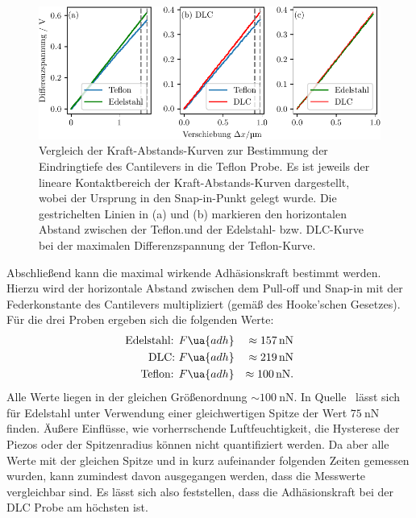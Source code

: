 \begin{figure}
  \centering
  \includegraphics[scale = 1]{../analysis/data/force_distance/eindringtiefe.pdf}
  \caption{Vergleich der Kraft-Abstands-Kurven zur Bestimmung der Eindringtiefe des Cantilevers in die Teflon Probe.
  Es ist jeweils der lineare Kontaktbereich der Kraft-Abstands-Kurven dargestellt, wobei der Ursprung in den Snap-in-Punkt
  gelegt wurde. Die gestrichelten Linien in (a) und (b) markieren den horizontalen Abstand zwischen der Teflon.und der Edelstahl- bzw. DLC-Kurve
  bei der maximalen Differenzspannung der Teflon-Kurve.}
  \label{fig: depth}
\end{figure}

Abschließend kann die maximal wirkende Adhäsionskraft bestimmt werden. Hierzu wird der horizontale
Abstand zwischen dem Pull-off und Snap-in mit der Federkonstante des Cantilevers multipliziert (gemäß des Hooke'schen Gesetzes).
Für die drei Proben ergeben sich die folgenden Werte:
\begin{align}
  \begin{aligned}
    \text{Edelstahl: } & F\ua{adh} &\approx \SI{157}{\nano\newton}\\
    \text{DLC: } & F\ua{adh}       &\approx \SI{219}{\nano\newton}\\
    \text{Teflon: } & F\ua{adh}    &\approx \SI{100}{\nano\newton}.
  \end{aligned}
\end{align}
Alle Werte liegen in der gleichen Größenordnung $\sim \SI{100}{\nano\newton}$.
In Quelle~\cite{afm_datasheet} lässt sich für Edelstahl unter Verwendung einer gleichwertigen Spitze der Wert $\SI{75}{\nano\newton}$ finden.
Äußere Einflüsse, wie vorherrschende Luftfeuchtigkeit,
die Hysterese der Piezos oder der Spitzenradius können nicht quantifiziert werden. Da aber alle Werte mit der gleichen Spitze und in kurz aufeinander
folgenden Zeiten gemessen wurden, kann zumindest davon ausgegangen werden, dass die Messwerte vergleichbar sind. Es lässt sich also feststellen, dass die
Adhäsionskraft bei der DLC Probe am höchsten ist.
\FloatBarrier
